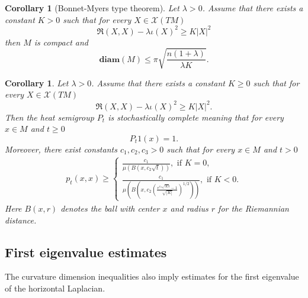 \documentclass[11pt]{article}
\numberwithin{equation}{section}
\newtheorem{corollary}[theorem]{Corollary}
\begin{document}
\begin{corollary}[Bonnet-Myers type theorem]\label{BMyers}
Let $\lambda > 0$. Assume that there exists a constant $K >0$ such that for every $X \in  \mathcal{X}(TM)$
        \[
        \mathfrak{R} (X,X) -\lambda \iota (X)^2 \ge K | X|^2
        \]
then $M$ is compact and 
\[
\mathbf{diam} (M ) \le \pi \sqrt{ \frac{n(1+\lambda)}{\lambda K}}.
\]
\end{corollary}


\begin{corollary}
 Let $\lambda  >0$. Assume that there exists a constant $K \ge 0$ such that for every $X \in  \mathcal{X}(TM)$
        \[
        \mathfrak{R} (X,X) -\lambda \iota (X)^2 \ge K | X|^2.
        \]
Then  the heat  semigroup $P_t$ is stochastically complete meaning that for every $x \in M$ and $t \ge 0$
\[
P_t 1(x)=1.
\] 
Moreover, there exist  constants $c_1,c_2,c_3>0$ such that for every $x \in M$ and $t>0$
\begin{align*}
p_t(x,x) \ge
\begin{cases}
 \frac{c_1}{\mu(B(x ,c_2\sqrt{t}))}, \text{ if } K=0, \\
 \frac{c_1}{\mu\left(B\left(x ,c_2\left(\frac{e^{c_3\sqrt{|K|}t}-1}{ \sqrt{|K|}} \right)^{1/2}\right)\right)}, \text{ if } K<0.
 \end{cases}
\end{align*}
Here $B(x,r)$ denotes the  ball with center $x$ and radius $r$ for the Riemannian distance.
\end{corollary}

\subsection{First eigenvalue estimates}

The curvature dimension inequalities also imply estimates for the first eigenvalue of the horizontal Laplacian.
\end{document}
